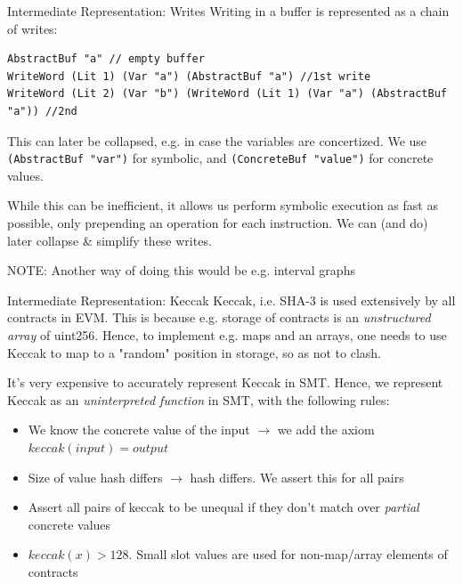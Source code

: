 \documentclass[aspectratio=169]{beamer}
\begin{document}
\begin{frame}[fragile=singleslide]{Intermediate Representation: Writes}
Writing in a buffer is represented as a chain of writes:
\begin{Verbatim}[frame=single, framerule=0.2mm, framesep=2mm,fontsize=\small]
AbstractBuf "a" // empty buffer
WriteWord (Lit 1) (Var "a") (AbstractBuf "a") //1st write
WriteWord (Lit 2) (Var "b") (WriteWord (Lit 1) (Var "a") (AbstractBuf "a")) //2nd
\end{Verbatim}
This can later be collapsed, e.g. in case the variables are concertized. We use \texttt{(AbstractBuf "var")} for symbolic, and \texttt{(ConcreteBuf "value")} for concrete values.
\bigskip

While this can be inefficient, it allows us perform symbolic execution as fast as possible, only prepending an operation for each instruction. We can (and do) later collapse \& simplify these writes.
\bigskip

NOTE: Another way of doing this would be e.g. interval graphs
\end{frame}

\begin{frame}[fragile=singleslide]{Intermediate Representation: Keccak}
Keccak, i.e. SHA-3 is used extensively by all contracts in EVM. This is because e.g. storage of contracts is an \emph{unstructured array} of uint256. Hence, to implement e.g. maps and an arrays, one needs to use Keccak to map to a "random" position in storage, so as not to clash.
\bigskip

It's very expensive to accurately represent Keccak in SMT. Hence, we represent Keccak as an \emph{uninterpreted function} in SMT, with the following rules:
\begin{itemize}
\item We know the concrete value of the input $\rightarrow$ we add the axiom $keccak(input)=output$
\item Size of value hash differs $\rightarrow$ hash differs. We assert this for all pairs
\item Assert all pairs of keccak to be unequal if they don't match over \emph{partial} concrete values
\item $keccak(x) > 128$. Small slot values are used for non-map/array elements of contracts
\end{itemize}
\end{frame}
\end{document}

